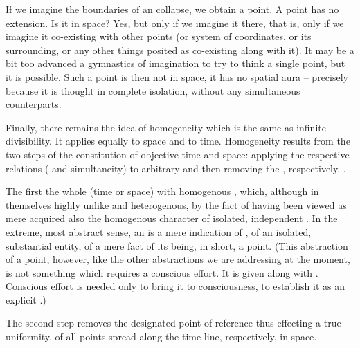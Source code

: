If we imagine the boundaries of an  collapse, we obtain a 
point. A point has no extension. Is it in space? Yes, but only if we 
imagine it there, that is, only if we imagine it co-existing with 
other points (or system of coordinates, or its surrounding, or any 
other things posited as co-existing along with it). It may be a bit 
too advanced a gymnastics of imagination to try to think a single 
point, but it is possible. Such a point is then not in space, 
it has no spatial aura -- precisely because it is thought in complete 
isolation, without any simultaneous counterparts.

\pa
Finally, there remains the idea of homogeneity which is the same as 
infinite divisibility. It applies equally to space and to 
time.
Homogeneity results from the two steps of the constitution of objective 
time and space: applying the respective relations ( and 
simultaneity) to arbitrary 
 and then removing the  , 
respectively, . 

The first  the whole (time or space) with homogenous 
, which, although in themselves highly unlike and 
heterogenous, by the fact of having been viewed as mere 
 acquired also the homogenous character of isolated, 
independent . In the extreme, most abstract sense, an 
 is a mere indication of , of an isolated, 
substantial entity, of a mere fact of its being, in short, a point. 
(This abstraction of a point, however, like the other abstractions we are
addressing at the moment, is not something which requires a conscious 
effort. It is given along with . Conscious effort 
is needed only to bring it to  consciousness, to establish it as an
explicit .) 

The second step removes the designated point of reference thus 
effecting a true uniformity,  of all points spread 
along the time line, respectively, in space.


